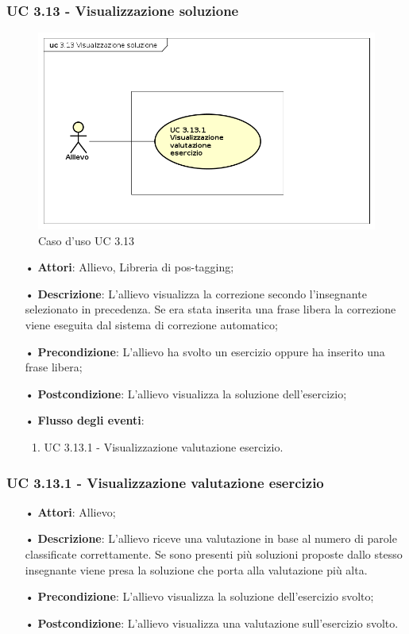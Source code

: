 \subsubsection{UC 3.13 - Visualizzazione soluzione}
\begin{figure}[H]
	\centering
	\includegraphics[width=17cm]{img/UC313.png} 
	\caption{Caso d'uso UC 3.13}\label{fig:313}
\end{figure}
\begin{itemize}
	\item[•]\textbf{Attori}: Allievo, Libreria di pos-tagging;
	\item[•]\textbf{Descrizione}: L'allievo visualizza la correzione secondo l'insegnante selezionato in precedenza. Se era stata inserita una frase libera la correzione viene eseguita dal sistema di correzione automatico;
	\item[•]\textbf{Precondizione}: L'allievo ha svolto un esercizio oppure ha inserito una frase libera;
	\item[•]\textbf{Postcondizione}: L'allievo visualizza la soluzione dell'esercizio;
	\item[•]\textbf{Flusso degli eventi}:
	\begin{enumerate}
		\item UC 3.13.1 - Visualizzazione valutazione esercizio.  
	\end{enumerate}
\end{itemize}


\subsubsection{UC 3.13.1 - Visualizzazione valutazione esercizio}   

\begin{itemize}
\item[•]\textbf{Attori}: Allievo;
\item[•]\textbf{Descrizione}: L'allievo riceve una valutazione in base al numero di parole classificate correttamente. Se sono presenti più soluzioni proposte dallo stesso insegnante viene presa la soluzione che porta alla valutazione più alta.
\item[•]\textbf{Precondizione}: L'allievo visualizza la soluzione dell'esercizio svolto;
\item[•]\textbf{Postcondizione}: L'allievo visualizza una valutazione sull'esercizio svolto.
\end{itemize}



